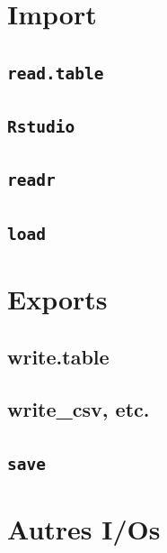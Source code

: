\documentclass[
  letterpaper,
  DIV=11,
  numbers=noendperiod]{scrreprt}
\begin{document}
\hypertarget{import}{%
\section{Import}\label{import}}

\hypertarget{read.table}{%
\subsection{\texorpdfstring{\texttt{read.table}}{read.table}}\label{read.table}}

\hypertarget{rstudio-1}{%
\subsection{\texorpdfstring{\texttt{Rstudio}}{Rstudio}}\label{rstudio-1}}

\hypertarget{readr}{%
\subsection{\texorpdfstring{\texttt{readr}}{readr}}\label{readr}}

\hypertarget{load}{%
\subsection{\texorpdfstring{\texttt{load}}{load}}\label{load}}

\hypertarget{exports}{%
\section{Exports}\label{exports}}

\hypertarget{write.table}{%
\subsection{write.table}\label{write.table}}

\hypertarget{write_csv-etc.}{%
\subsection{write\_csv, etc.}\label{write_csv-etc.}}

\hypertarget{save}{%
\subsection{\texorpdfstring{\texttt{save}}{save}}\label{save}}

\hypertarget{autres-ios}{%
\section{Autres I/Os}\label{autres-ios}}
\end{document}
